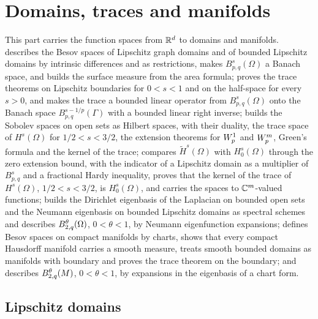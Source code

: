 
\part{Domains, traces and manifolds}
\label{part:domains}

This part carries the function spaces from $\mathbb{R}^d$ to domains and manifolds.
 describes the Besov spaces of Lipschitz graph domains and of bounded
Lipschitz domains by intrinsic differences and as restrictions, makes $B^s_{p,q}(\Omega)$ a
Banach space, and builds the surface measure from the area formula; 
proves the trace theorems on Lipschitz boundaries for $0 < s < 1$ and on the half-space for every
$s > 0$, and makes the trace a bounded linear operator from $B^s_{p,q}(\Omega)$ onto the Banach
space $B^{s - 1/p}_{p,q}(\Gamma)$ with a bounded linear right inverse; 
builds the Sobolev spaces on open sets as Hilbert spaces, with their duality, the trace space
of $H^s(\Omega)$ for $1/2 < s < 3/2$, the extension theorems for $W^{1}_{p}$ and $W^{m}_{p}$,
Green's formula and the kernel of the trace;  compares
$\tilde H^s(\Omega)$ with $H^s_0(\Omega)$ through the zero extension bound, with the indicator
of a Lipschitz domain as a multiplier of $B^s_{p,q}$ and a fractional Hardy inequality, proves
that the kernel of the trace of $H^s(\Omega)$, $1/2 < s < 3/2$, is $H^s_0(\Omega)$, and carries
the spaces to $\mathbb{C}^m$-valued functions;  builds the Dirichlet
eigenbasis of the Laplacian on bounded open sets and the Neumann eigenbasis on bounded Lipschitz
domains as spectral schemes and describes $B^{\theta}_{2,q}(\Omega)$, $0 < \theta < 1$, by
Neumann eigenfunction expansions;  defines Besov spaces on compact manifolds by
charts, shows that every compact Hausdorff manifold carries a smooth measure, treats smooth
bounded domains as manifolds with boundary and proves the trace theorem on the boundary; and
 describes $B^{\theta}_{2,q}(M)$, $0 < \theta < 1$, by expansions
in the eigenbasis of a chart form.

\chapter{Lipschitz domains}
\label{ch:lipschitz-domains}

